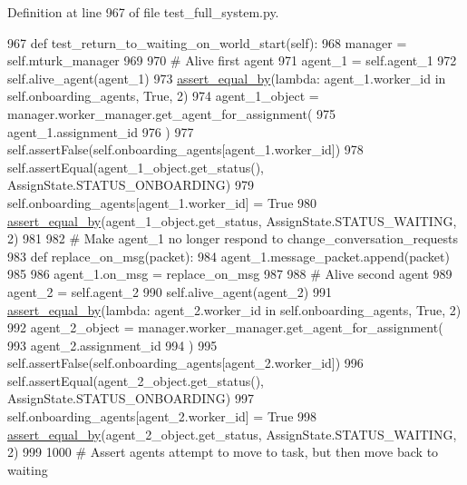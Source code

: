 Definition at line 967 of file test\+\_\+full\+\_\+system.\+py.


\begin{DoxyCode}
967     \textcolor{keyword}{def }test\_return\_to\_waiting\_on\_world\_start(self):
968         manager = self.mturk\_manager
969 
970         \textcolor{comment}{# Alive first agent}
971         agent\_1 = self.agent\_1
972         self.alive\_agent(agent\_1)
973         \hyperlink{namespaceparlai_1_1mturk_1_1core_1_1test_1_1test__full__system_a0b463246d35658a2e422010f13dcf819}{assert\_equal\_by}(\textcolor{keyword}{lambda}: agent\_1.worker\_id \textcolor{keywordflow}{in} self.onboarding\_agents, \textcolor{keyword}{True}, 2)
974         agent\_1\_object = manager.worker\_manager.get\_agent\_for\_assignment(
975             agent\_1.assignment\_id
976         )
977         self.assertFalse(self.onboarding\_agents[agent\_1.worker\_id])
978         self.assertEqual(agent\_1\_object.get\_status(), AssignState.STATUS\_ONBOARDING)
979         self.onboarding\_agents[agent\_1.worker\_id] = \textcolor{keyword}{True}
980         \hyperlink{namespaceparlai_1_1mturk_1_1core_1_1test_1_1test__full__system_a0b463246d35658a2e422010f13dcf819}{assert\_equal\_by}(agent\_1\_object.get\_status, AssignState.STATUS\_WAITING, 2)
981 
982         \textcolor{comment}{# Make agent\_1 no longer respond to change\_conversation\_requests}
983         \textcolor{keyword}{def }replace\_on\_msg(packet):
984             agent\_1.message\_packet.append(packet)
985 
986         agent\_1.on\_msg = replace\_on\_msg
987 
988         \textcolor{comment}{# Alive second agent}
989         agent\_2 = self.agent\_2
990         self.alive\_agent(agent\_2)
991         \hyperlink{namespaceparlai_1_1mturk_1_1core_1_1test_1_1test__full__system_a0b463246d35658a2e422010f13dcf819}{assert\_equal\_by}(\textcolor{keyword}{lambda}: agent\_2.worker\_id \textcolor{keywordflow}{in} self.onboarding\_agents, \textcolor{keyword}{True}, 2)
992         agent\_2\_object = manager.worker\_manager.get\_agent\_for\_assignment(
993             agent\_2.assignment\_id
994         )
995         self.assertFalse(self.onboarding\_agents[agent\_2.worker\_id])
996         self.assertEqual(agent\_2\_object.get\_status(), AssignState.STATUS\_ONBOARDING)
997         self.onboarding\_agents[agent\_2.worker\_id] = \textcolor{keyword}{True}
998         \hyperlink{namespaceparlai_1_1mturk_1_1core_1_1test_1_1test__full__system_a0b463246d35658a2e422010f13dcf819}{assert\_equal\_by}(agent\_2\_object.get\_status, AssignState.STATUS\_WAITING, 2)
999 
1000         \textcolor{comment}{# Assert agents attempt to move to task, but then move back to waiting}

\end{DoxyCode}
